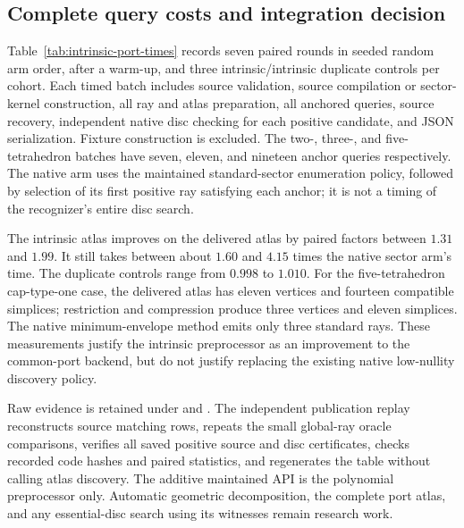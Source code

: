 \subsection{Complete query costs and integration decision}

Table~\ref{tab:intrinsic-port-times} records seven paired rounds in
seeded random arm order, after a warm-up, and three intrinsic/intrinsic
duplicate controls per cohort.  Each timed batch includes source
validation, source compilation or sector-kernel construction, all ray
and atlas preparation, all anchored queries, source recovery, independent
native disc checking for each positive candidate, and JSON serialization.
Fixture construction is excluded.  The two-, three-, and five-tetrahedron
batches have seven, eleven, and nineteen anchor queries respectively.
The native arm uses the maintained standard-sector enumeration policy,
followed by selection of its first positive ray satisfying each anchor;
it is not a timing of the recognizer's entire disc search.

\begin{table}[ht]
\centering\small

\caption{Complete supplied-sector Euler-query batches in milliseconds.
Ratios are medians of paired ratios, not ratios of displayed medians.
The final column is the duplicate intrinsic-arm control.}
\label{tab:intrinsic-port-times}
\end{table}

The intrinsic atlas improves on the delivered atlas by paired factors
between $1.31$ and $1.99$.  It still takes between about $1.60$ and
$4.15$ times the native sector arm's time.  The duplicate controls
range from $0.998$ to $1.010$.  For the five-tetrahedron cap-type-one
case, the delivered atlas has eleven vertices and fourteen compatible
simplices; restriction and compression produce three vertices and
eleven simplices.  The native minimum-envelope method emits only three
standard rays.  These measurements justify the intrinsic preprocessor
as an improvement to the common-port backend, but do not justify
replacing the existing native low-nullity discovery policy.

Raw evidence is retained under  and
.  The independent publication replay
reconstructs source matching rows, repeats the small global-ray oracle
comparisons, verifies all saved positive source and disc certificates,
checks recorded code hashes and paired statistics, and regenerates the
table without calling atlas discovery.  The additive maintained API is
the polynomial preprocessor only.  Automatic geometric decomposition,
the complete port atlas, and any essential-disc search using its
witnesses remain research work.
